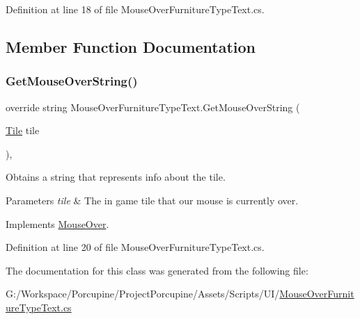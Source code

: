 Definition at line 18 of file Mouse\+Over\+Furniture\+Type\+Text.\+cs.



\subsection{Member Function Documentation}
\mbox{\label{class_mouse_over_furniture_type_text_a651f612de5c73264437f9109e1f7229c}} 
\subsubsection{\texorpdfstring{Get\+Mouse\+Over\+String()}{GetMouseOverString()}}
{\footnotesize\ttfamily override string Mouse\+Over\+Furniture\+Type\+Text.\+Get\+Mouse\+Over\+String (\begin{DoxyParamCaption}\item[{\hyperlink{class_tile}{Tile}}]{tile }\end{DoxyParamCaption})\hspace{0.3cm}{\ttfamily [protected]}, {\ttfamily [virtual]}}



Obtains a string that represents info about the tile. 


\begin{DoxyParams}{Parameters}
{\em tile} & The in game tile that our mouse is currently over.\\
\hline
\end{DoxyParams}


Implements \hyperlink{class_mouse_over_a9878f4e4b19afa1056f4386aa0e67452}{Mouse\+Over}.



Definition at line 20 of file Mouse\+Over\+Furniture\+Type\+Text.\+cs.



The documentation for this class was generated from the following file\+:\begin{DoxyCompactItemize}
\item 
G\+:/\+Workspace/\+Porcupine/\+Project\+Porcupine/\+Assets/\+Scripts/\+U\+I/\hyperlink{_mouse_over_furniture_type_text_8cs}{Mouse\+Over\+Furniture\+Type\+Text.\+cs}\end{DoxyCompactItemize}
